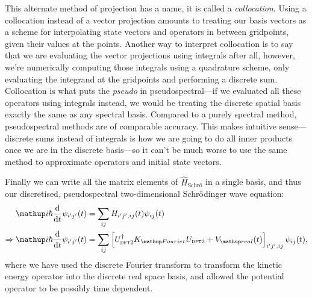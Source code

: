 This alternate method of projection has a name, it is called a \emph{collocation}\cite[p227]{tannor_introduction_2007}. Using a collocation instead of a vector projection amounts to treating our basis vectors as a scheme for interpolating state vectors and operators in between gridpoints, given their values at the points. Another way to interpret collocation is to say that we are evaluating the vector projections using integrals after all, however, we're numerically computing those integrals using a quadrature scheme, only evaluating the integrand at the gridpoints and performing a discrete sum\cite[p283]{tannor_introduction_2007}. Collocation is what puts the \emph{pseudo} in pseudospectral---if we evaluated all these operators using integrals instead, we would be treating the discrete spatial basis exactly the same as any spectral basis. Compared to a purely spectral method, pseudospectral methods are of comparable accuracy\cite{orszag_comparison_1972}. This makes intuitive sense---discrete sums instead of integrals is how we are going to do all inner products once we are in the discrete basis---so it can't be much worse to use the same method to approximate operators and initial state vectors. 

Finally we can write all the matrix elements of $\hat H_\textrm{Schr\"o}$ in a single basis, and thus our discretised, pseudospectral two-dimensional Schr\"odinger wave equation:
\begin{align}
\ii\hbar\dv{t}\psi_{i^\prime j^\prime}(t) &= \sum_{ij} H_{i^\prime j^\prime, ij}(t) \psi_{ij}(t)\\
\Rightarrow \ii\hbar\dv{t}\psi_{i^\prime j^\prime}(t) &=\sum_{ij}
\left[
U^\dagger_{\textsc{dft2}}K_\up{Fourier}U_{\textsc{dft2}}
 + V_\up{real}(t)
\right]_{i^\prime j^\prime, ij}\psi_{ij}(t),
\end{align}
where we have used the discrete Fourier transform to transform the kinetic energy operator into the discrete real space basis, and allowed the potential operator to be possibly time dependent.

